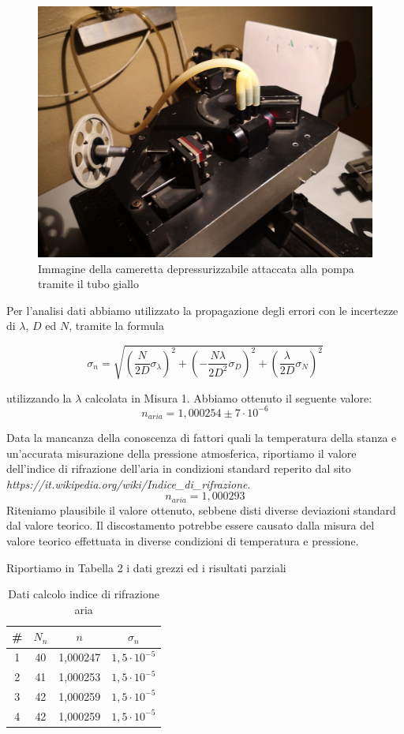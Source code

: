 \documentclass{article}
\begin{document}
\begin{figure}[h!]
  \centering
  \includegraphics[width=0.6\linewidth]{IM cameretta}
  \caption{Immagine della cameretta depressurizzabile attaccata alla pompa tramite il tubo giallo}
\end{figure}

\pagebreak

Per l'analisi dati abbiamo utilizzato la propagazione degli errori con le incertezze di $\lambda$, $D$ ed $N$, tramite la formula

\begin{equation}
\sigma_n = \sqrt{ (\frac{N}{2D} \sigma_\lambda)^2 + ({-} \frac{N \lambda}{2 D^2} \sigma_D)^2 + (\frac{\lambda}{2D} \sigma_N)^2} 
\end{equation}

utilizzando la $\lambda$ calcolata in Misura 1. Abbiamo ottenuto il seguente valore:
\[ n_{aria} = 1,000254 \pm 7 \cdot 10^{-6} \]

Data la mancanza della conoscenza di fattori quali la temperatura della stanza e un'accurata misurazione della pressione atmosferica, riportiamo il valore dell'indice di rifrazione dell'aria in condizioni standard reperito dal sito \textit{https://it.wikipedia.org/wiki/Indice\_di\_rifrazione}.
\[ n_{aria} = 1,000293  \]
Riteniamo plausibile il valore ottenuto, sebbene disti diverse deviazioni standard dal valore teorico. Il discostamento potrebbe essere causato dalla misura del valore teorico effettuata in diverse condizioni di temperatura e pressione.

Riportiamo in Tabella 2 i dati grezzi ed i risultati parziali


\begin{table}[h!]
\centering
\begin{tabular}{ | c | c | c | c | }
\hline
 \# & $N_n$ & $n$ & $\sigma_n$\\
\hline
   1 & 40 & 1,000247 & $1,5 \cdot 10^{-5}$\\
   2 & 41 & 1,000253 & $1,5 \cdot 10^{-5}$\\
   3 & 42 & 1,000259 & $1,5 \cdot 10^{-5}$\\
   4 & 42 & 1,000259 & $1,5 \cdot 10^{-5}$\\
\hline
\end{tabular}
\caption{Dati calcolo indice di rifrazione aria}
\label{table:2}
\end{table}
\end{document}
